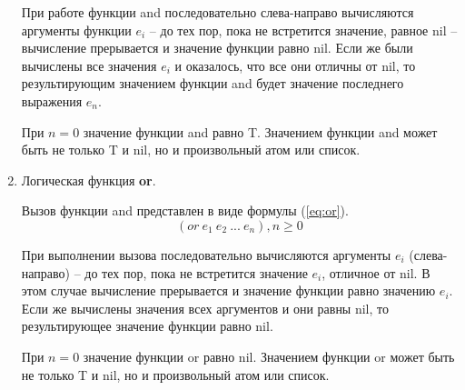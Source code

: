 \begin{enumerate}
При работе функции and последовательно слева-направо вычисляются аргументы функции $e_i$  -- до тех пор, пока не встретится значение, равное nil -- вычисление прерывается и значение функции равно nil. Если же были вычислены все значения $e_i$ и оказалось, что все они отличны от nil, то результирующим значением функции and будет значение последнего выражения $e_n$.

При $n=0$ значение функции and равно T. Значением функции and может быть не только T и nil, но и произвольный атом или список.
\newpage
\item Логическая функция \textbf{or}.

Вызов функции and представлен в виде формулы (\ref{eq:or}).
\begin{equation}
	\label{eq:or}
	(or\ e_1\ e_2\ ...\ e_n), n \geq 0
\end{equation}

При выполнении вызова последовательно вычисляются аргументы $e_i$
(слева-направо) -- до тех пор, пока не встретится значение $e_i$, отличное от nil. В этом случае вычисление прерывается и значение функции равно значению $e_i$. Если же вычислены значения всех аргументов и они равны nil, то результирующее значение функции
равно nil.

При $n=0$ значение функции or равно nil. Значением функции or может быть не только T и nil, но и произвольный атом или список.

\end{enumerate}